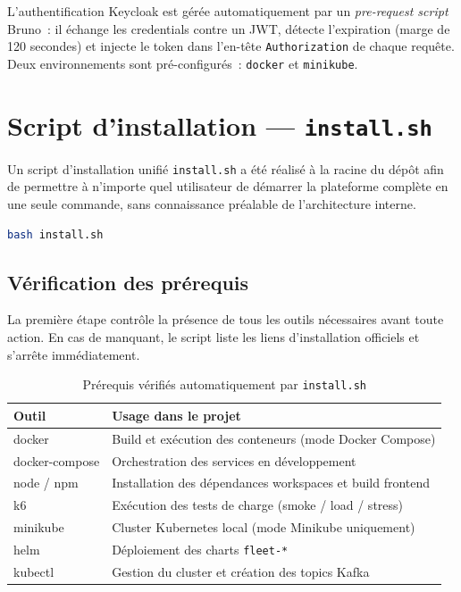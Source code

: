 \documentclass[12pt,a4paper]{article}
\begin{document}
L'authentification Keycloak est g\'{e}r\'{e}e automatiquement par un
\textit{pre-request script} Bruno~: il \'{e}change les credentials contre un
JWT, d\'{e}tecte l'expiration (marge de 120 secondes) et injecte le token
dans l'en-t\^{e}te \texttt{Authorization} de chaque requ\^{e}te. Deux
environnements sont pr\'{e}-configur\'{e}s~: \texttt{docker} et \texttt{minikube}.

\newpage
\section{Script d'installation --- \texttt{install.sh}}

Un script d'installation unifi\'{e} \texttt{install.sh} a \'{e}t\'{e} r\'{e}alis\'{e} \`{a} la
racine du d\'{e}p\^{o}t afin de permettre \`{a} n'importe quel utilisateur de
d\'{e}marrer la plateforme compl\`{e}te en une seule commande, sans connaissance
pr\'{e}alable de l'architecture interne.

\begin{lstlisting}[language=bash, caption=Lancement de l'installation]
bash install.sh
\end{lstlisting}

\subsection{V\'{e}rification des pr\'{e}requis}

La premi\`{e}re \'{e}tape contr\^{o}le la pr\'{e}sence de tous les outils n\'{e}cessaires
avant toute action. En cas de manquant, le script liste les liens
d'installation officiels et s'arr\^{e}te imm\'{e}diatement.

\begin{table}[H]
\centering
\renewcommand{\arraystretch}{1.4}
\begin{tabular}{
  >{\ttfamily\raggedright\arraybackslash}p{4cm}
  >{\raggedright\arraybackslash}p{8.5cm}
}
\toprule
\rowcolor{secondary}
\normalfont\textbf{Outil} & \normalfont\textbf{Usage dans le projet} \\
\midrule
docker            & Build et ex\'{e}cution des conteneurs (mode Docker Compose) \\
\rowcolor{rowgray}
docker-compose    & Orchestration des services en d\'{e}veloppement \\
node / npm        & Installation des d\'{e}pendances workspaces et build frontend \\
\rowcolor{rowgray}
k6                & Ex\'{e}cution des tests de charge (smoke / load / stress) \\
minikube          & Cluster Kubernetes local (mode Minikube uniquement) \\
\rowcolor{rowgray}
helm              & D\'{e}ploiement des charts \texttt{fleet-*} \\
kubectl           & Gestion du cluster et cr\'{e}ation des topics Kafka \\
\bottomrule
\end{tabular}
\caption{Pr\'{e}requis v\'{e}rifi\'{e}s automatiquement par \texttt{install.sh}}
\end{table}
\end{document}
